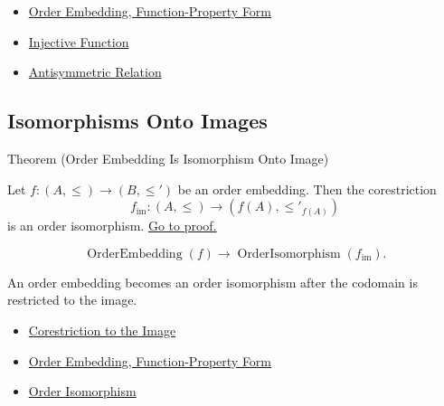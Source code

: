 \begin{dependencies}
\begin{itemize}
  \item \hyperref[def:order-embedding-function-form]{Order Embedding, Function-Property Form}
  \item \hyperref[def:injective]{Injective Function}
  \item \hyperref[def:antisymmetric]{Antisymmetric Relation}
\end{itemize}
\end{dependencies}

\subsection*{Isomorphisms Onto Images}

\begin{theorembox}{Theorem (Order Embedding Is Isomorphism Onto Image)}
\begin{theorem}\label{thm:order-embedding-isomorphism-onto-image}
Let $f:(A,\leq)\to(B,\leq')$ be an order embedding. Then the corestriction
\[
f_{\operatorname{im}}:(A,\leq)\to(f(A),\leq'_{f(A)})
\]
is an order isomorphism.
\hyperref[prf:order-embedding-isomorphism-onto-image]{Go to proof.}
\end{theorem}
\end{theorembox}

\begin{remark*}
\[
  \operatorname{OrderEmbedding}(f)
  \to
  \operatorname{OrderIsomorphism}(f_{\operatorname{im}}).
\]
\end{remark*}

\begin{remark*}[Interpretation]
An order embedding becomes an order isomorphism after the codomain is restricted
to the image.
\end{remark*}

\begin{dependencies}
\begin{itemize}
  \item \hyperref[def:corestriction-to-image]{Corestriction to the Image}
  \item \hyperref[def:order-embedding-function-form]{Order Embedding, Function-Property Form}
  \item \hyperref[def:order-isomorphism-ordered-sets]{Order Isomorphism}
\end{itemize}
\end{dependencies}

